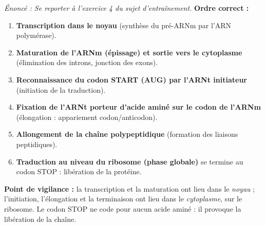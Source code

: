 \documentclass[11pt]{article}
\begin{document}
\begin{corrige}
\textit{Énoncé : Se reporter à l'exercice 4 du sujet d'entraînement.}
\tcblower
\textbf{Ordre correct :}
\begin{enumerate}
    \item \textbf{Transcription dans le noyau} (synthèse du pré-ARNm par l'ARN polymérase).
    \item \textbf{Maturation de l'ARNm (épissage) et sortie vers le cytoplasme} (élimination des introns, jonction des exons).
    \item \textbf{Reconnaissance du codon START (AUG) par l'ARNt initiateur} (initiation de la traduction).
    \item \textbf{Fixation de l'ARNt porteur d'acide aminé sur le codon de l'ARNm} (élongation : appariement codon/anticodon).
    \item \textbf{Allongement de la chaîne polypeptidique} (formation des liaisons peptidiques).
    \item \textbf{Traduction au niveau du ribosome (phase globale)} se termine au codon STOP : libération de la protéine.
\end{enumerate}
\textbf{Point de vigilance :} la transcription et la maturation ont lieu dans le \emph{noyau} ; l'initiation, l'élongation et la terminaison ont lieu dans le \emph{cytoplasme}, sur le ribosome. Le codon STOP ne code pour aucun acide aminé : il provoque la libération de la chaîne.
\end{corrige}
\end{document}
